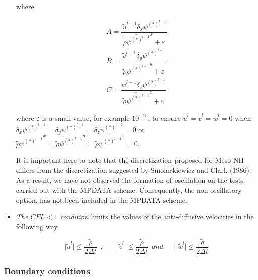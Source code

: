 \begin{itemize}
\noindent where

\begin{eqnarray}
\label{equA}
A =
 \dfrac{ \, \tilde{u}^{l-1} \delta_{x} \psi^{(*)^{l-1}}   }
{ \overline{\tilde{\rho} \psi^{(*)^{l-1}}}^x +\varepsilon }   \\
\label{equB}
B =
 \dfrac{ \, \tilde{v}^{l-1} \delta_{y} \psi^{(*)^{l-1}}   }
{ \overline{\tilde{\rho} \psi^{(*)^{l-1}}}^y +\varepsilon }   \\
\label{equC}
C =
 \dfrac{    \tilde{w}^{l-1} \delta_{z} \psi^{(*)^{l-1}}   }
{ \overline{\tilde{\rho} \psi^{(*)^{l-1}}}^z +\varepsilon }
\end{eqnarray}

\noindent where $\varepsilon$ is a small value, for example $10^{-15}$, to
ensure $\tilde{u}^{l}=\tilde{v}^{l}=\tilde{w}^{l}=0$ when
$\delta_{x} \psi^{(*)^{l-1}}=\delta_{y} \psi^{(*)^{l-1}}=
\delta_{z} \psi^{(*)^{l-1}}=0$ or $\overline{\tilde{\rho} \psi^{(*)^{l-1}}}^x=
\overline{\tilde{\rho} \psi^{(*)^{l-1}}}^y=
\overline{\tilde{\rho} \psi^{(*)^{l-1}}}^z=0$.

It is important here to note that the discretization proposed for Meso-NH
differs from the discretization suggested by Smolarkiewicz and Clark (1986). As a
result, we have not observed the formation of oscillation on the tests carried
out with the MPDATA scheme. Consequently, the non-oscillatory option, has not been
included in the MPDATA scheme.

\item {\em The $CFL<1$ condition } limits the values of the anti-diffusive velocities
in the following way

\begin{equation}
\mid\tilde{u}^{l}\mid\leq \dfrac{\tilde{\rho}}{2 \Delta t} \, \, \, , \, \, \, \, \, \, \, \,
\mid\tilde{v}^{l}\mid\leq \dfrac{\tilde{\rho}}{2 \Delta t} \, \, \, and \, \, \, \, \, \, \,
\mid\tilde{w}^{l}\mid\leq \dfrac{\tilde{\rho}}{2 \Delta t}
\end{equation}

\end{itemize}

\subsubsection{Boundary conditions}

